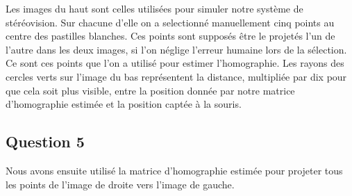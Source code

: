 \documentclass[12pt]{report}
\begin{document}
Les images du haut sont celles utilisées pour simuler notre système de stéréovision. Sur chacune d'elle on a selectionné manuellement cinq points au centre des pastilles blanches. Ces points sont supposés être le projetés l'un de l'autre dans les deux images, si l'on néglige l'erreur humaine lors de la sélection. Ce sont ces points que l'on a utilisé pour estimer l'homographie. Les rayons des cercles verts sur l'image du bas représentent la distance, multipliée par dix pour que cela soit plus visible, entre la position donnée par notre matrice d'homographie estimée et la position captée à la souris.

\subsection{Question 5}

Nous avons ensuite utilisé la matrice d'homographie estimée pour projeter tous les points de l'image de droite vers l'image de gauche.
\end{document}
